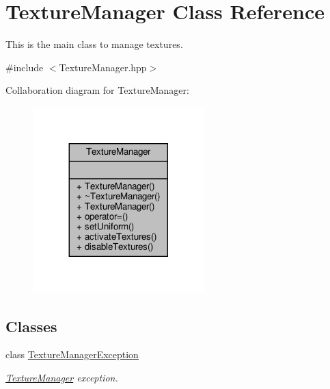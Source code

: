 \hypertarget{class_texture_manager}{}\section{Texture\+Manager Class Reference}
\label{class_texture_manager}


This is the main class to manage textures.  




{\ttfamily \#include $<$Texture\+Manager.\+hpp$>$}



Collaboration diagram for Texture\+Manager\+:
\nopagebreak
\begin{figure}[H]
\begin{center}
\leavevmode
\includegraphics[width=188pt]{class_texture_manager__coll__graph}
\end{center}
\end{figure}
\subsection*{Classes}
\begin{DoxyCompactItemize}
\item 
class \hyperlink{class_texture_manager_1_1_texture_manager_exception}{Texture\+Manager\+Exception}
\begin{DoxyCompactList}\small\item\em \hyperlink{class_texture_manager}{Texture\+Manager} exception. \end{DoxyCompactList}\end{DoxyCompactItemize}
